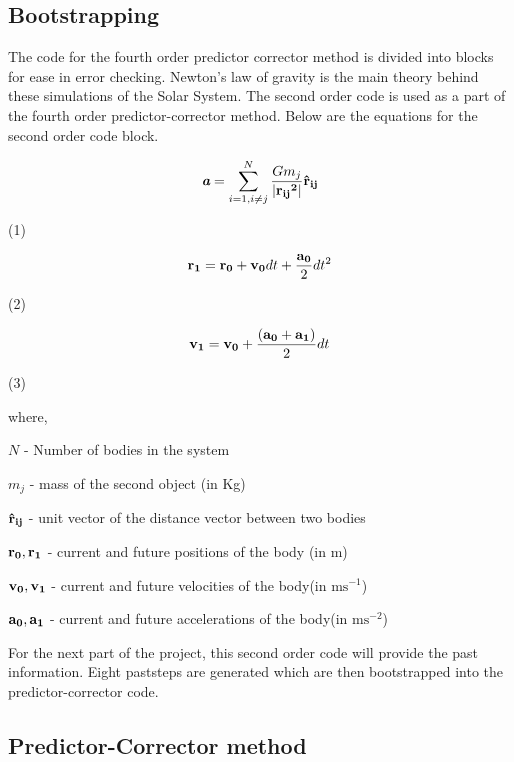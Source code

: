 \documentclass[11pt]{article}
\begin{document}
\subsection{Bootstrapping}
{\normalsize{
The code for the fourth order predictor corrector method is divided into blocks for ease in error checking. Newton's law of gravity is the main theory behind these simulations of the Solar System. The second order code is used as a part of the fourth order predictor-corrector method. Below are the equations for the second order code block.}}

\[  \textit{\textbf {a}} = \sum_{i=1, i \neq j}^{N}  \frac{Gm_j} {\left| \bf {r_{ij}}^2 \right|}  \bf{\hat {r}_{ij}} \]  \begin{flushright} (1)  \end{flushright}

\[ {\bf r_1} = {\bf r_0} + {\bf v_0} dt + \frac{{\bf a_0}} {2} dt^2 \]
\begin{flushright} (2)  \end{flushright}

\[ {\bf v_1} = {\bf v_0} + \frac{({\bf a_0}+{\bf a_1})} {2} dt \]
\begin{flushright} (3)  \end{flushright}

\smallskip

where, 

\smallskip

$N$ - Number of bodies in the system 

$m_j$ - mass of the second object (in Kg)

${\bf {\hat {r}_{ij}}}$  - unit vector of the distance vector between two bodies

${\bf r_0, r_1}$ - current and future positions of the body (in m)

${\bf v_0, v_1}$ - current and future velocities of the body(in $\mathrm {m s}^{-1}$)

${\bf a_0, a_1}$ - current and future accelerations of the body(in $\mathrm {m s}^{-2}$)

\bigskip   
                      
{\normalsize{
For the next part of the project, this second order code will provide the past information. Eight paststeps are generated which are then bootstrapped into the predictor-corrector code. }}

\bigskip


\subsection{Predictor-Corrector method}
\medskip
\end{document}
